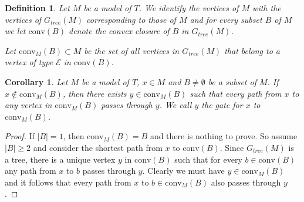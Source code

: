 \documentclass[10pt,a4paper]{amsart}
\newcommand{\E}{\mathcal{E}}
\newcommand{\conv}{\mathrm{conv}}
\newtheorem{definition}[defi]{Definition}
\newtheorem{corollary}[defi]{Corollary}
\begin{document}
 


\begin{definition}\label{def:convex}
Let $M$ be a model of $T$. We identify the vertices of $M$ with the vertices of $G_{tree}(M)$ corresponding to those of $M$ and for every subset $B$ of $M$ we let $\conv(B)$ denote the convex closure of $B$ in $G_{tree}(M)$.

Let $\conv_M(B)\subset M$ be the set of all vertices in $G_{tree}(M)$  that belong to a vertex of type $\E$ in $\conv(B)$.
\end{definition}


\begin{corollary}\label{cor:gate}
    Let $M$ be a model of $T$, $x \in M$ and $B\neq\emptyset$ be a subset of $M$. 
    If $x \notin \conv_M(B)$, then there exists $y \in \conv_M(B)$ such that
    every path from $x$ to  any vertex in $\conv_M(B)$ passes through $y$. We call $y$ the gate for $x$ to $\conv_M(B)$. 
\end{corollary}
\begin{proof}
If $|B|=1$, then $\conv_M(B)=B$ and there is nothing to prove. So assume $|B|\geq 2$ and consider the shortest path from $x$ to $\conv(B)$. Since $G_{tree}(M)$ is a tree, there is a unique vertex $y$ in $\conv(B)$ such that for every $b\in \conv(B)$ any path from $x$ to $b$ passes through $y$. Clearly we must have $y\in \conv_M(B)$ and it follows that every  path from $x$ to $b\in\conv_M(B)$ also passes through $y$.
\end{proof}
\end{document}
